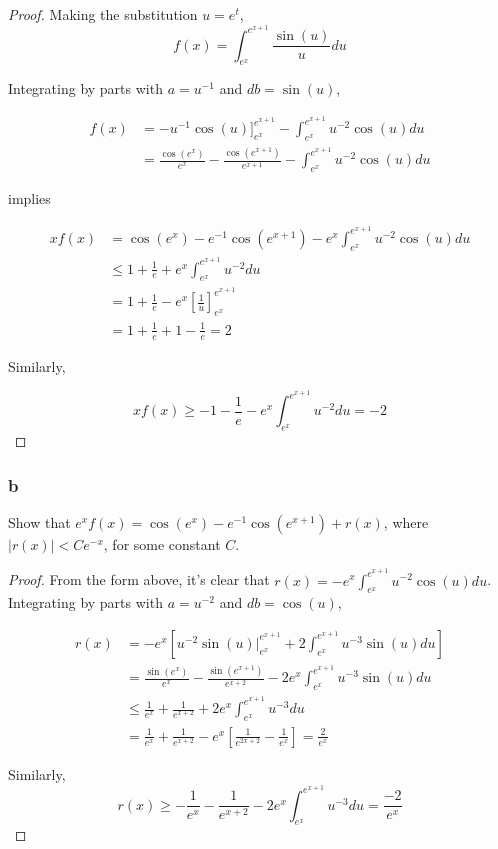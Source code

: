 \documentclass{amsart}
\begin{document}
\begin{proof}
Making the substitution $u = e^t$,
\[
f(x) = \int_{e^x}^{e^{x+1}} \frac{\sin(u)}{u}du
\]

Integrating by parts with $a = u^{-1}$ and $db = \sin(u)$,

\begin{align*}
f(x) &= -u^{-1}\cos(u)\Big]_{e^x}^{e^{x+1}} - \int_{e^x}^{e^{x+1}} u^{-2}\cos(u)du \\
&= \frac{\cos(e^x)}{e^x} - \frac{\cos(e^{x+1})}{e^{x+1}} - \int_{e^x}^{e^{x+1}} u^{-2}\cos(u)du
\end{align*}

implies

\begin{align*}
xf(x) &= \cos(e^x) - e^{-1}\cos(e^{x+1}) - e^x\int_{e^x}^{e^{x+1}} u^{-2}\cos(u)du \\
&\leq 1 + \frac{1}{e} + e^x\int_{e^x}^{e^{x+1}} u^{-2}du \\
&= 1 + \frac{1}{e} - e^x\left[\frac{1}{u}\right]_{e^x}^{e^{x+1}} \\
&= 1 + \frac{1}{e} + 1 - \frac{1}{e} = 2
\end{align*}

Similarly,

\[
xf(x) \geq -1 - \frac{1}{e} - e^x\int_{e^x}^{e^{x+1}} u^{-2}du = -2
\]

\end{proof}

\subsubsection*{b}

Show that $e^x f(x) = \cos(e^x) - e^{-1}\cos(e^{x+1}) + r(x)$, where $|r(x)| < Ce^{-x}$, for some constant $C$.

\begin{proof}
From the form above, it's clear that $r(x) = - e^x\int_{e^x}^{e^{x+1}} u^{-2}\cos(u)du$. Integrating by parts with $a = u^{-2}$ and $db = \cos(u)$,

\begin{align*}
r(x) &= -e^{x} \left[
u^{-2}\sin(u)\Big|_{e^x}^{e^{x+1}} + 2\int_{e^x}^{e^{x+1}} u^{-3}\sin(u)du \right] \\
&= \frac{\sin(e^x)}{e^x} - \frac{\sin(e^{x+1})}{e^{x+2}} - 2e^x\int_{e^x}^{e^{x+1}}u^{-3}\sin(u)du \\
&\leq \frac{1}{e^x} + \frac{1}{e^{x+2}} + 2e^x\int_{e^x}^{e^{x+1}}u^{-3}du \\
&= \frac{1}{e^x} + \frac{1}{e^{x+2}} -e^x\left[\frac{1}{e^{2x+2}} - \frac{1}{e^x}\right] = \frac{2}{e^x}
\end{align*}

Similarly,
\[
r(x) \geq -\frac{1}{e^x} - \frac{1}{e^{x+2}} - 2e^x\int_{e^x}^{e^{x+1}}u^{-3}du = \frac{-2}{e^x}
\]

\end{proof}
\end{document}
